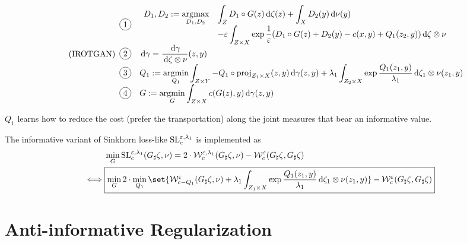 \documentclass[11pt,a4paper]{article}
\begin{document}
\begin{equation}
    \label{eqn:dual-info-rotgan}
    \tag{IROTGAN}
    \begin{array}{c>{\displaystyle}l}
        \circled {1} &
        \begin{array}{*2{>{\displaystyle}l}}
            D_1, D_2 \assign \argmax_{D_1, D_2} & \int_{Z} {D_1 \circ G(z) \d \zeta(z)} + \int_{X}{D_2(y) \d
            \nu(y)} \\
              & - \eps \int_{\ZX} {\exp{\frac{1}{\eps}(D_1 \circ G(z) + D_2 (y) - c(x, y) + Q_1(z_2, y))} \d \zetaxnu}
        \end{array} \\
        \circled{2}& \d \gamma = \radon{\gamma}{\zetaxnu}(z, y) \\
        \circled{3}& Q_1 \assign \argmin_{Q_1} \int_{\ZY}{  - Q_1\circ \projZAX(z, y)}\d \gamma(z, y)   + \lambda_1 \int_{\ZBX}{\exp{\frac{Q_1(z_1, y)}{\lambda_1}} \d \oprod{\zeta_1}{\nu}(z_1, y)}\\
        \circled{4}& G \assign \argmin_{G} \int_{\ZX}c(G(z), y) \d \gamma(z, y)
    \end{array}
\end{equation}

$Q_1$ learns how to reduce the cost (prefer the transportation) along the joint measures that bear an informative value.

The informative variant of Sinkhorn loss-like $\mathrm{SL}_{c}^{\varepsilon, \lambda_1}$ is implemented as
\begin{align}
    &\min_{G} \SLice(\pf{G}{\zeta}, \nu) = 2 \cdot \Wice(\pf{G}{\zeta}, \nu) - \Wce(\pf{G}{\zeta}, \pf{G}{\zeta}) \\%
    \iff &\boxed{\min_{G} 2 \cdot \min_{Q_1}\set{ \W_{c - Q_1}^{\eps}(\pf{G}{\zeta}, \nu)+ \lambda_1 \int_{\ZAX}{\exp{\frac{Q_1(z_1, y)}{\lambda_1}} \d \oprod{\zeta_1 }{\nu (z_1, y)}}} - \Wce(\pf{G}{\zeta}, \pf{G}{\zeta})}
\end{align}




\section{Anti-informative Regularization}
\end{document}
